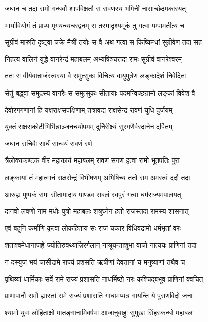 \twolineshloka
{जघान च तदा रामो गन्धर्वौ शापविक्षतौ}
{स रावणस्य भगिनी नासाच्छेदमकारयत्}


\twolineshloka
{भार्यावियोगं तं प्राप्य मृगयन्व्यचरद्वनम्}
{स तस्मादृश्यमूकं तु गत्वा पम्पामतीत्य च}


\twolineshloka
{सुग्रीवं मारुतिं दृष्ट्वा चक्रे मैत्रीं तयोः स वै}
{अथ गत्वा स किष्किन्धां सुग्रीवेण तदा सह}


\twolineshloka
{निहत्य वालिनं युद्धे वानरेन्द्रं महाबलम्}
{अभ्यषिञ्चत्तदा रामः सुग्रीवं वानरेश्वरम्}


\twolineshloka
{ततः स वीर्यवान्राजंस्त्वरया वै समुत्सुकः}
{विचित्य वायुपुत्रेण लङ्कादेशं निवेदितः}


\twolineshloka
{सेतुं बद्ध्वा समुद्रस्य वानरैः स समुत्सुकः}
{सीतायाः पदमन्विच्छन्रामो लङ्कां विवेश वै}


\twolineshloka
{देवोरगगणानां हि यक्षराक्षसपक्षिणाम्}
{तत्रावद्यं राक्षसेन्द्रं रावणं युधि दुर्जयम्}


\twolineshloka
{युक्तं राक्षसकोटीभिर्भिन्नाञ्जनचयोपमम्}
{दुर्निरीक्ष्यं सुरगणैर्वरदानेन दर्पितम्}


\onelineshloka
{जघान सचिवैः सार्धं सान्वयं रावणं रणे}


\twolineshloka
{त्रैलोक्यकण्टकं वीरं महाकायं महाबलम्}
{रावणं सगणं हत्वा रामो भूतपतिः पुरा}


\twolineshloka
{लङ्कायां तं महात्मानं राक्षसेन्द्रं विभीषणम्}
{अभिषिच्य ततो राम अमरत्वं ददौ तदा}


\twolineshloka
{आरुह्य पुष्पकं रामः सीतामादाय पाण्डव}
{सबलं स्वपुरं गत्वा धर्मराज्यमपालयत्}


\twolineshloka
{दानवो लवणो नाम मधोः पुत्रो महाबलः}
{शत्रुघ्नेन हतो राजंस्तदा रामस्य शासनात्}


\twolineshloka
{एवं बहूनि कर्माणि कृत्वा लोकहिताय सः}
{राजं चकार विधिवद्रामो धर्मभृतां वरः}


\twolineshloka
{शताश्वमेधानाजह्रे ज्योतिरुक्थ्यान्निरर्गलान्}
{नाश्रूयन्ताशुभा वाचो नात्ययः प्राणिनां तदा}


\twolineshloka
{न दस्युजं भयं चासीद्रामे राज्यं प्रशसति}
{ऋषीणां देवतानां च मनुष्याणां तथैव च}


\twolineshloka
{पृथिव्यां धार्मिकाः सर्वे रामे राज्यं प्रशासति}
{नाधर्मिष्ठो नरः कश्चिद्बभूव प्राणिनां क्वचित्}


\twolineshloka
{प्राणापानौ समौ ह्यास्तां रामे राज्यं प्रशासति}
{गाधामप्यत्र गायन्ति ये पुराणविदो जनाः}


\twolineshloka
{श्यामो युवा लोहिताक्षो मातङ्गानामिवर्षभः}
{आजानुबाहुः सुमुखः सिंहस्कन्धो महाबलः}


